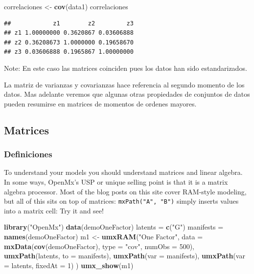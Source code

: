 \documentclass[11pt,]{article}
\newenvironment{Shaded}{\begin{snugshade}}{\end{snugshade}}
\newcommand{\KeywordTok}[1]{\textcolor[rgb]{0.13,0.29,0.53}{\textbf{#1}}}
\newcommand{\DataTypeTok}[1]{\textcolor[rgb]{0.13,0.29,0.53}{#1}}
\newcommand{\DecValTok}[1]{\textcolor[rgb]{0.00,0.00,0.81}{#1}}
\newcommand{\StringTok}[1]{\textcolor[rgb]{0.31,0.60,0.02}{#1}}
\newcommand{\NormalTok}[1]{#1}
\begin{document}
\begin{Shaded}
\begin{Highlighting}[]
\NormalTok{correlaciones <-}\StringTok{ }\KeywordTok{cov}\NormalTok{(data1)}
\NormalTok{correlaciones}
\end{Highlighting}
\end{Shaded}

\begin{verbatim}
##            z1        z2         z3
## z1 1.00000000 0.3620867 0.03606888
## z2 0.36208673 1.0000000 0.19658670
## z3 0.03606888 0.1965867 1.00000000
\end{verbatim}

Note: En este caso las matrices coinciden pues los datos han sido
estandarizados.

La matriz de varianzas y covarianzas hace referencia al segundo momento
de los datos. Mas adelante veremos que algunas otras propiedades de
conjuntos de datos pueden resumirse en matrices de momentos de ordenes
mayores.

\subsection{Matrices}\label{matrices}

\subsubsection{Definiciones}\label{definiciones}

To understand your models you should understand matrices and linear
algebra. In some ways, OpenMx's USP or unique selling point is that it
is a matrix algebra processor. Most of the blog posts on this site cover
RAM-style modeling, but all of this sits on top of matrices:
\texttt{mxPath("A",\ "B")} simply inserts values into a matrix cell: Try
it and see!

\begin{Shaded}
\begin{Highlighting}[]
\KeywordTok{library}\NormalTok{(}\StringTok{"OpenMx"}\NormalTok{)}
\KeywordTok{data}\NormalTok{(demoOneFactor)}
\NormalTok{latents  =}\StringTok{ }\KeywordTok{c}\NormalTok{(}\StringTok{"G"}\NormalTok{)}
\NormalTok{manifests =}\StringTok{ }\KeywordTok{names}\NormalTok{(demoOneFactor)}
\NormalTok{m1 <-}\StringTok{ }\KeywordTok{umxRAM}\NormalTok{(}\StringTok{"One Factor"}\NormalTok{, }
             \DataTypeTok{data =} \KeywordTok{mxData}\NormalTok{(}\KeywordTok{cov}\NormalTok{(demoOneFactor), }
                           \DataTypeTok{type =} \StringTok{"cov"}\NormalTok{, }\DataTypeTok{numObs =} \DecValTok{500}\NormalTok{),}
    \KeywordTok{umxPath}\NormalTok{(latents, }\DataTypeTok{to =}\NormalTok{ manifests),}
    \KeywordTok{umxPath}\NormalTok{(}\DataTypeTok{var =}\NormalTok{ manifests),}
    \KeywordTok{umxPath}\NormalTok{(}\DataTypeTok{var =}\NormalTok{ latents, }\DataTypeTok{fixedAt =} \DecValTok{1}\NormalTok{)}
\NormalTok{)}
\KeywordTok{umx_show}\NormalTok{(m1)}
\end{Highlighting}
\end{Shaded}
\end{document}
